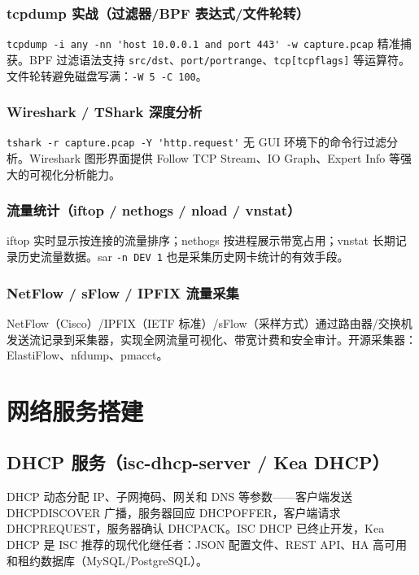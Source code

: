 \documentclass[12pt,UTF8]{ctexbook}
\begin{document}
    \subsection{tcpdump 实战（过滤器/BPF 表达式/文件轮转）}

\verb|tcpdump -i any -nn 'host 10.0.0.1 and port 443' -w capture.pcap| 精准捕获。BPF 过滤语法支持 \verb|src/dst|、\verb|port/portrange|、\verb|tcp[tcpflags]| 等运算符。文件轮转避免磁盘写满：\verb|-W 5 -C 100|。

    \subsection{Wireshark / TShark 深度分析}

\verb|tshark -r capture.pcap -Y 'http.request'| 无 GUI 环境下的命令行过滤分析。Wireshark 图形界面提供 Follow TCP Stream、IO Graph、Expert Info 等强大的可视化分析能力。

    \subsection{流量统计（iftop / nethogs / nload / vnstat）}

iftop 实时显示按连接的流量排序；nethogs 按进程展示带宽占用；vnstat 长期记录历史流量数据。sar \verb|-n DEV 1| 也是采集历史网卡统计的有效手段。

    \subsection{NetFlow / sFlow / IPFIX 流量采集}

NetFlow（Cisco）/IPFIX（IETF 标准）/sFlow（采样方式）通过路由器/交换机发送流记录到采集器，实现全网流量可视化、带宽计费和安全审计。开源采集器：ElastiFlow、nfdump、pmacct。

\chapter{网络服务搭建}
\label{chap:network-services}

  \section{DHCP 服务（isc-dhcp-server / Kea DHCP）}

DHCP 动态分配 IP、子网掩码、网关和 DNS 等参数——客户端发送 DHCPDISCOVER 广播，服务器回应 DHCPOFFER，客户端请求 DHCPREQUEST，服务器确认 DHCPACK。ISC DHCP 已终止开发，Kea DHCP 是 ISC 推荐的现代化继任者：JSON 配置文件、REST API、HA 高可用和租约数据库（MySQL/PostgreSQL）。
\end{document}
